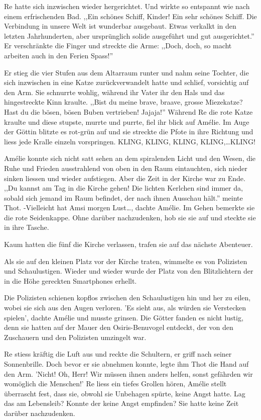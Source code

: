 \documentclass[11pt,titlepage,a5paper]{book}
\begin{document}
Re hatte sich inzwischen wieder hergerichtet. Und wirkte so entspannt wie nach einem erfrischenden Bad. ,,Ein schönes Schiff, Kinder! Ein sehr schönes Schiff. Die Verbindung in unsere Welt ist wunderbar ausgebaut. Etwas verkalkt in den letzten Jahrhunderten, aber ursprünglich solide ausgeführt und gut ausgerichtet.'' Er verschränkte die Finger und streckte die Arme: ,,Doch, doch, so macht arbeiten auch in den Ferien Spass!'' 

Er stieg die vier Stufen aus dem Altarraum runter und nahm seine Tochter, die sich inzwischen in eine Katze zurückverwandelt hatte und schlief, vorsichtig auf den Arm. Sie schnurrte wohlig, während ihr Vater ihr den Hals und das hingestreckte Kinn kraulte. ,,Bist du meine brave, braave, grosse Miezekatze? Hast du die bösen, bösen Buben vertrieben! Jajaja!'' Während Re die rote Katze kraulte und diese stupste, murrte und purrte, fiel ihr blick auf Amélie. Im Auge der Göttin blitzte es rot-grün auf und sie streckte die Pfote in ihre Richtung und liess jede Kralle einzeln vorspringen. KLING, KLING, KLING, KLING,\dots KLING!

Amélie konnte sich nicht satt sehen an dem spiralenden Licht und den Wesen, die Ruhe und Frieden ausstrahlend von oben in den Raum eintauchten, sich nieder sinken liessen und wieder aufstiegen. Aber die Zeit in der Kirche war zu Ende. ,,Du kannst am Tag in die Kirche gehen! Die lichten Kerlchen sind immer da, sobald sich jemand im Raum befindet, der nach ihnen Ausschau hält.'' meinte Thot. -Vielleicht hat Amsi morgen Lust\dots, dachte Amélie. Im Gehen bemerkte sie die rote Seidenkappe. Ohne darüber nachzudenken, hob sie sie auf und steckte sie in ihre Tasche.

Kaum hatten die fünf die Kirche verlassen, trafen sie auf das nächste Abenteuer.

Als sie auf den kleinen Platz vor der Kirche traten, wimmelte es von Polizisten und Schaulustigen. Wieder und wieder wurde der Platz von den Blitzlichtern der in die Höhe gereckten Smartphones erhellt. 

Die Polizisten schienen kopflos zwischen den Schaulustigen hin und her zu eilen, wobei sie sich aus den Augen verloren. 'Es sieht aus, als würden sie Verstecken spielen', dachte Amélie und musste grinsen. Die Götter fanden es nicht lustig, denn sie hatten auf der Mauer den Osiris-Benuvogel entdeckt, der von den Zuschauern und den Polizisten umzingelt war. 

Re stiess kräftig die Luft aus und reckte die Schultern, er griff nach seiner Sonnenbrille. Doch bevor er sie abnehmen konnte, legte ihm Thot die Hand auf den Arm. 'Nicht! Oh, Herr! Wir müssen ihnen anders helfen, sonst gefährden wir womöglich die Menschen!' Re liess ein tiefes Grollen hören, Amélie stellt überrascht fest, dass sie, obwohl sie Unbehagen spürte, keine Angst hatte. Lag das am Lebensleib? Konnte der keine Angst empfinden? Sie hatte keine Zeit darüber nachzudenken.
\end{document}
